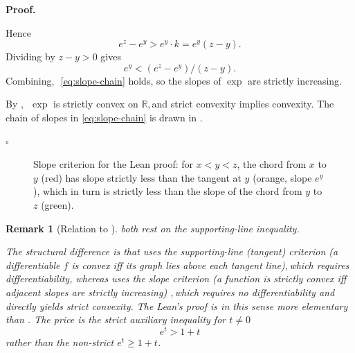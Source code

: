\documentclass[11pt,reqno]{amsart}
\providecommand{\R}{\mathbb{R}}
\theoremstyle{redplain}
\newtheorem{remark}{Remark}[section]
\renewcommand{\qedsymbol}{\textcolor{proofqed}{\ensuremath{\square}}}
\renewenvironment{proof}[1][Proof]{\par\noindent\textbf{\textcolor{proofhead}{#1.}}\par\nobreak}{\par\nobreak\hfill\qedsymbol}
\providecommand{\comma}{,\,}
\numberwithin{equation}{section}
\begin{document}
\begin{proof}
\noindent Hence 
\begin{equation*}
e^{z}-e^{y}>e^{y}\cdot k=e^{y}(z-y).
\end{equation*}%
\noindent Dividing by $z-y>0$ gives 
\begin{equation*}
e^{y}<(e^{z}-e^{y})/(z-y).
\end{equation*}%
\noindent Combining\comma\ \cref{eq:slope-chain} holds, so the slopes of $%
\exp $ are strictly increasing.

\noindent By \comma\ $\exp $ is strictly convex on 
$\R$\comma and strict convexity implies convexity.\newline
The chain of slopes in \cref{eq:slope-chain} is drawn in %
.
\end{proof}

\begin{figure}[tbph]
\centering
{}
\caption{Slope criterion for the Lean proof: for $x<y<z$, the chord from $x$
to $y$ (red) has slope strictly less than the tangent at $y$ (orange, slope $%
e^{y}$), which in turn is strictly less than the slope of the chord from $y$
to $z$ (green).}
\label{fig:slope-criterion}
\end{figure}

\begin{remark}[Relation to ]
 both rest on the
supporting-line inequality. \noindent

The structural difference is that  uses the \emph{%
supporting-line (tangent) criterion} (a differentiable $f$ is convex iff its
graph lies above each tangent line)\comma which requires differentiability,
whereas  uses the \emph{slope criterion} (a
function is strictly convex iff adjacent slopes are strictly increasing)%
\comma which requires no differentiability and directly yields strict
convexity.\newline
The Lean's proof is in this sense more elementary than %
.\newline
The price is the strict auxiliary inequality for $t\neq 0$ 
\begin{equation*}
e^{t}>1+t
\end{equation*}%
rather than the non-strict $e^{t}\geq 1+t$.
\end{remark}
\end{document}
